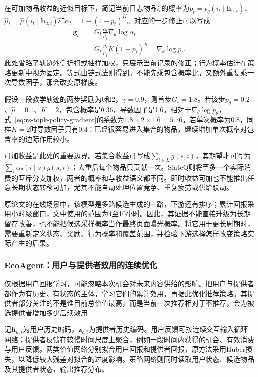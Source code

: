 在可加物品收益的近似目标下，简记当前日志物品$i_t$的概率为$p_t=p_\theta(i_t\mid\bm{h}_{u,t})$、$\widehat\mu_t=\widehat\mu(i_t\mid\bm{h}_{u,t})$和$\alpha_t=1-(1-p_t)^K$。对应的一步修正可以写成
\begin{equation}
 \begin{aligned}
 \widehat{\bm{g}}_t
 &=G_t\,\frac{\alpha_t}{\widehat\mu_t}
   \nabla_\theta\log\alpha_t\\
 &=G_t\,\frac{p_t}{\widehat\mu_t}
   K(1-p_t)^{K-1}\nabla_\theta\log p_t.
 \end{aligned}
 \label{eq:rs-topk-policy-gradient}
\end{equation}
此处省略了轨迹外侧折扣或抽样加权，只展示当前记录的修正；行为概率估计在策略更新中视为固定。等式由链式法则得到。不能先乘包含概率比，又额外重复乘一次导数因子，那会改变原梯度。

假设一段教学轨迹的两步奖励为0和2，$\gamma=0.9$，则首步$G_t=1.8$。若该步$p_\theta=0.2$、$\widehat\mu=0.1$、$K=2$，包含概率是0.36，导数因子是1.6。相对于$\nabla_\theta\log p_\theta$，式~\eqref{eq:rs-topk-policy-gradient}的系数为$1.8\times2\times1.6=5.76$。若单次概率为0.8，同样$K=2$时导数因子只有0.4：已经很容易进入集合的物品，继续增加单次概率对包含率的边际作用较小。

可加收益是此处的重要边界。若集合收益可写成$\sum_{i\in L}g(s,i)$，其期望才可写为$\sum_i\alpha_\theta(i\mid s)g(s,i)$；去重后每个物品只贡献一次。SlateQ则将至多一个实际消费的互斥分支加权，两者的概率和与收益语义都不同。即时收益可加也不能推出任意长期状态转移可加，尤其不能自动处理位置竞争、重复疲劳或供给联动。

原论文的在线场景中，该模型是多路候选生成的一路，下游还有排序；累计回报采用小时级窗口，文中使用的范围为4至10小时。因此，其证据不能直接升级为长期留存改善，也不能把候选采样概率当作最终页面曝光概率。将它用于更长周期时，需要重新定义状态、奖励、行为概率和覆盖范围，并检验下游选择怎样改变策略实际产生的后果。

\subsubsection{EcoAgent：用户与提供者效用的连续优化}
\label{sec:rs-ecoagent}

仅根据用户回报学习，可能忽略本次机会对未来内容供给的影响。把用户与提供者都作为有历史、有状态的主体，学习它们的累计效用，再据此优化推荐策略。其提供者部分关注的不是谁目前总价值最高，而是当前一次推荐相对于不推荐，会为被选提供者增加多少后续效用

记$\bm{h}_{u,t}$为用户历史编码，$\bm{z}_{c,t}$为提供者历史编码。用户反馈可按连续交互输入循环网络；提供者反馈在较慢时间尺度上聚合，例如一段时间内获得的机会、有效消费与用户反馈。两类价值网络分别拟合用户回报和提供者回报，原方法采用Huber损失，以降低较大残差对拟合的过度影响。策略网络则同时读取用户状态、候选物品及其提供者状态，输出推荐分布。

